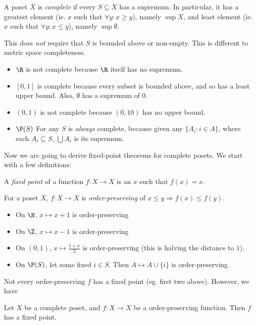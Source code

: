 \documentclass[a4paper]{article}
\begin{document}
\begin{defi}
  A poset $X$ is \emph{complete} if every $S\subseteq X$ has a supremum. In particular, it has a greatest element (ie. $x$ such that $\forall y: x \geq y$), namely $\sup X$, and least element (ie. $x$ such that $\forall y: x \leq y$), namely $\sup \emptyset$.
\end{defi}
\note This does \emph{not} require that $S$ is bounded above or non-empty. This is different to metric space completeness.

\begin{eg}\leavevmode
  \begin{itemize}
    \item $\R$ is not complete because $\R$ itself has no supremum.
    \item $[0, 1]$ is complete because every subset is bounded above, and so has a least upper bound. Also, $\emptyset$ has a supremum of $0$.
    \item $(0, 1)$ is not complete because $(0, 10)$ has no upper bound.
    \item $\P(S)$ For any $S$ is \emph{always} complete, because given any $\{A_i: i\in A\}$, where each $A_i\subseteq S$, $\bigcup A_i$ is its supremum.
  \end{itemize}
\end{eg}

Now we are going to derive fixed-point theorems for complete posets. We start with a few definitions:

\begin{defi}
  A \emph{fixed point} of a function $f:X\to X$ is an $x$ such that $f(x) = x$.
\end{defi}

\begin{defi}
  For a poset $X$, $f: X\to X$ is \emph{order-preserving} of $x \leq y \Rightarrow  f(x) \leq f(y)$.
\end{defi}

\begin{eg}\leavevmode
  \begin{itemize}
    \item On $\N$, $x\mapsto x + 1$ is order-preserving
    \item On $\Z$, $x\mapsto x - 1$ is order-preserving
    \item On $(0, 1)$, $x\mapsto \frac{1 + x}{2}$ is order-preserving (this is halving the distance to $1$).
    \item On $\P(S)$, let some fixed $i\in S$. Then $A\mapsto A\cup \{i\}$ is order-preserving.
  \end{itemize}
\end{eg}
Not every order-preserving $f$ has a fixed point (eg. first two above). However, we have
\begin{thm}
  Let $X$ be a complete poset, and $f: X\to X$ be a order-preserving function. Then $f$ has a fixed point.
\end{thm}
\end{document}
